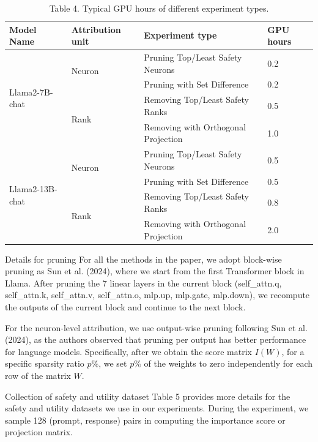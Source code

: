 \documentclass[10pt]{article}
\begin{document}
\begin{table}[h]
\begin{center}
\begin{tabular}{|l|l|l|l|}
\hline
Model Name & Attribution unit & Experiment type & GPU hours \\
\hline
\multirow{4}{*}{Llama2-7B-chat} & \multirow{2}{*}{Neuron} & Pruning Top/Least Safety Neurons & 0.2 \\
\hline
 &  & Pruning with Set Difference & 0.2 \\
\hline
 & \multirow{2}{*}{Rank} & Removing Top/Least Safety Ranks & 0.5 \\
\hline
 &  & Removing with Orthogonal Projection & 1.0 \\
\hline
\multirow{4}{*}{Llama2-13B-chat} & \multirow{2}{*}{Neuron} & Pruning Top/Least Safety Neurons & 0.5 \\
\hline
 &  & Pruning with Set Difference & 0.5 \\
\hline
 & \multirow{2}{*}{Rank} & Removing Top/Least Safety Ranks & 0.8 \\
\hline
 &  & Removing with Orthogonal Projection & 2.0 \\
\hline
\end{tabular}
\captionsetup{labelformat=empty}
\caption{Table 4. Typical GPU hours of different experiment types.}
\end{center}
\end{table}

Details for pruning For all the methods in the paper, we adopt block-wise pruning as Sun et al. (2024), where we start from the first Transformer block in Llama. After pruning the 7 linear layers in the current block (self\_attn.q, self\_attn.k, self\_attn.v, self\_attn.o, mlp.up, mlp.gate, mlp.down), we recompute the outputs of the current block and continue to the next block.

For the neuron-level attribution, we use output-wise pruning following Sun et al. (2024), as the authors observed that pruning per output has better performance for language models. Specifically, after we obtain the score matrix $I(W)$, for a specific sparsity ratio $p \%$, we set $p \%$ of the weights to zero independently for each row of the matrix $W$.

Collection of safety and utility dataset Table 5 provides more details for the safety and utility datasets we use in our experiments. During the experiment, we sample 128 (prompt, response) pairs in computing the importance score or projection matrix.
\end{document}
